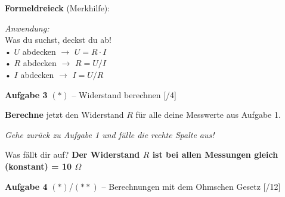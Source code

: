 \documentclass[11pt, a4paper]{article}
\newcommand{\loes}[1]{\textcolor{loesung}{\textbf{#1}}}
\newcommand{\punktebox}[1]{\hfill\small\textcolor{mittelgrau}{[\hspace{0.8em}/#1]}}
\newcommand{\aufgabe}[2]{%
    \needspace{4\baselineskip}%
    \vspace{8pt}%
    \noindent\textbf{\textcolor{fachfarbe}{Aufgabe #1}} #2%
    \vspace{4pt}%
    \nopagebreak[4]%
}
\newcommand{\operator}[1]{\textbf{#1}}
\begin{document}
\begin{merkkasten}
\vspace{0.5em}
\begin{minipage}[t]{0.5\linewidth}
\textbf{Formeldreieck} (Merkhilfe):

\begin{center}
\end{center}
\end{minipage}%
\begin{minipage}[t]{0.5\linewidth}
\small
\textit{Anwendung:}\\[0.3em]
Was du suchst, deckst du ab!\\[0.2em]
• $U$ abdecken $\rightarrow$ $U = R \cdot I$\\[0.1em]
• $R$ abdecken $\rightarrow$ $R = U / I$\\[0.1em]
• $I$ abdecken $\rightarrow$ $I = U / R$
\end{minipage}
\end{merkkasten}


\aufgabe{3}{$(*)$ – Widerstand berechnen} \punktebox{4}

\operator{Berechne} jetzt den Widerstand $R$ für alle deine Messwerte aus Aufgabe 1.

\vspace{0.3em}
\begin{hinweiskasten}
\textit{Gehe zurück zu Aufgabe 1 und fülle die rechte Spalte aus!}
\end{hinweiskasten}

\vspace{0.3em}
Was fällt dir auf? \loes{Der Widerstand $R$ ist bei allen Messungen gleich (konstant) = 10 $\Omega$}


\aufgabe{4}{$(*)$/$(**)$ – Berechnungen mit dem Ohmschen Gesetz} \punktebox{12}
\end{document}

